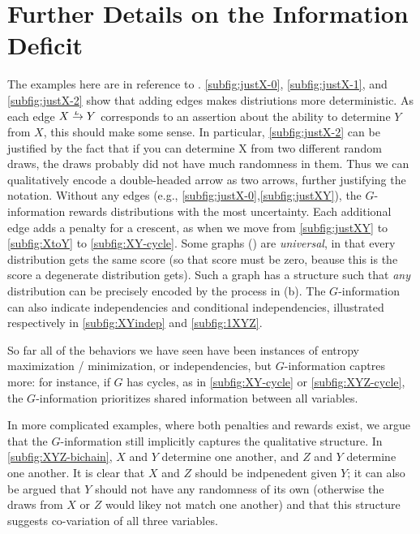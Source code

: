 \documentclass[letterpaper]{article} %
\theoremstyle{plain}
\theoremstyle{definition}
\theoremstyle{remark}
\newcommand{\ed}[3]{#2
  \overset{\smash{\mskip-5mu\raisebox{-1pt}{$\scriptscriptstyle
        #1$}}}{\rightarrow} #3}
\begin{document}
\section{Further Details on the Information Deficit}
\begin{vfull}
The examples here are in reference to .
\ref{subfig:justX-0}, \ref{subfig:justX-1}, and \ref{subfig:justX-2} show that adding edges makes distriutions more deterministic. 
As each edge $\ed LXY$ corresponds to an assertion about the ability to determine $Y$ from $X$, this should make some sense.
In particular, \ref{subfig:justX-2} can be justified by the fact that if you can determine X from two different random draws, the draws probably did not have much randomness in them. Thus we can qualitatively encode a double-headed arrow as two arrows, further justifying the notation.
%	
Without any edges (e.g., \ref{subfig:justX-0},\ref{subfig:justXY}), the $G$-information rewards distributions with the most uncertainty. Each additional edge adds a penalty for a crescent, as when we move from \ref{subfig:justXY} to \ref{subfig:XtoY} to \ref{subfig:XY-cycle}.
%
Some graphs () are \emph{universal}, in that every distribution gets the same score (so that score must be zero, beause this is the score a degenerate distribution gets). Such a graph has a structure such that \emph{any} distribution can be precisely encoded by the process in (b). 
%	
The $G$-information can also indicate independencies and conditional independencies, illustrated respectively in \ref{subfig:XYindep} and \ref{subfig:1XYZ}.

So far all of the behaviors we have seen have been instances of entropy maximization / minimization, or independencies, but $G$-information captres more: for instance, if $G$ has cycles, as in \ref{subfig:XY-cycle} or \ref{subfig:XYZ-cycle}, the $G$-information prioritizes shared information between all variables. 

In more complicated examples, where both penalties and rewards exist, we argue that the $G$-information still implicitly captures the qualitative structure. In \ref{subfig:XYZ-bichain}, $X$ and $Y$ determine one another, and $Z$ and $Y$ determine one another. It is clear that $X$ and $Z$ should be indpenedent given $Y$; it can also be argued that $Y$ should not have any randomness of its own (otherwise the draws from $X$ or $Z$ would likey not match one another) and that this structure suggests co-variation of all three variables.



\end{vfull}
\end{document}
